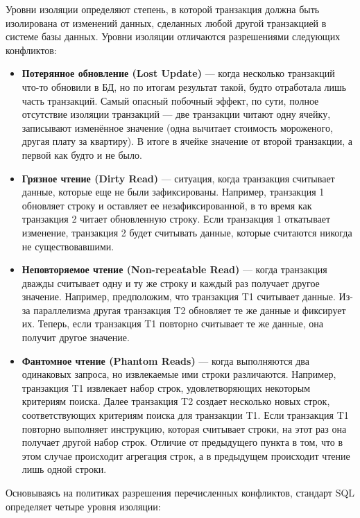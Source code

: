 Уровни изоляции определяют степень, в которой транзакция должна быть изолирована от изменений данных, сделанных любой другой транзакцией в системе базы данных. Уровни изоляции отличаются разрешениями следующих конфликтов:

\begin{itemize}
    \item 
        \textbf{Потерянное обновление (Lost Update)} — когда несколько транзакций что-то обновили в БД, но по итогам результат такой, будто отработала лишь часть транзакций. Самый опасный побочный эффект, по сути, полное отсутствие изоляции транзакций — две транзакции читают одну ячейку, записывают изменённое значение (одна вычитает стоимость мороженого, другая плату за квартиру). В итоге в ячейке значение от второй транзакции, а первой как будто и не было.
    \item 
        \textbf{Грязное чтение (Dirty Read)} — ситуация, когда транзакция считывает данные, которые еще не были зафиксированы. Например, транзакция 1 обновляет строку и оставляет ее незафиксированной, в то время как транзакция 2 читает обновленную строку. Если транзакция 1 откатывает изменение, транзакция 2 будет считывать данные, которые считаются никогда не существовавшими.
    \item 
        \textbf{Неповторяемое чтение (Non-repeatable Read)} — когда транзакция дважды считывает одну и ту же строку и каждый раз получает другое значение. Например, предположим, что транзакция T1 считывает данные. Из-за параллелизма другая транзакция T2 обновляет те же данные и фиксирует их. Теперь, если транзакция T1 повторно считывает те же данные, она получит другое значение.
    \item 
        \textbf{Фантомное чтение (Phantom Reads)} — когда выполняются два одинаковых запроса, но извлекаемые ими строки различаются. Например, транзакция T1 извлекает набор строк, удовлетворяющих некоторым критериям поиска. Далее транзакция T2 создает несколько новых строк, соответствующих критериям поиска для транзакции T1. Если транзакция T1 повторно выполняет инструкцию, которая считывает строки, на этот раз она получает другой набор строк. Отличие от предыдущего пункта в том, что в этом случае происходит агрегация строк, а в предыдущем происходит чтение лишь одной строки.
\end{itemize}

Основываясь на политиках разрешения перечисленных конфликтов, стандарт SQL определяет четыре уровня изоляции:

